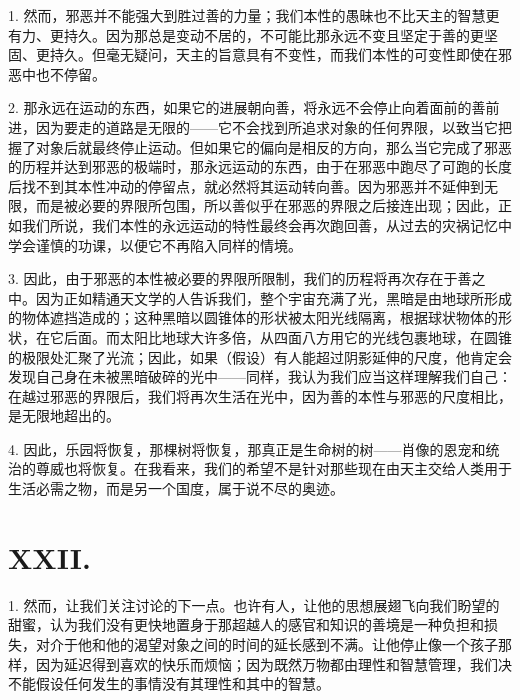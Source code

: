 1. 然而，邪恶并不能强大到胜过善的力量；我们本性的愚昧也不比天主的智慧更有力、更持久。因为那总是变动不居的，不可能比那永远不变且坚定于善的更坚固、更持久。但毫无疑问，天主的旨意具有不变性，而我们本性的可变性即使在邪恶中也不停留。\par

2. 那永远在运动的东西，如果它的进展朝向善，将永远不会停止向着面前的善前进，因为要走的道路是无限的——它不会找到所追求对象的任何界限，以致当它把握了对象后就最终停止运动。但如果它的偏向是相反的方向，那么当它完成了邪恶的历程并达到邪恶的极端时，那永远运动的东西，由于在邪恶中跑尽了可跑的长度后找不到其本性冲动的停留点，就必然将其运动转向善。因为邪恶并不延伸到无限，而是被必要的界限所包围，所以善似乎在邪恶的界限之后接连出现；因此，正如我们所说，我们本性的永远运动的特性最终会再次跑回善，从过去的灾祸记忆中学会谨慎的功课，以便它不再陷入同样的情境。\par

3. 因此，由于邪恶的本性被必要的界限所限制，我们的历程将再次存在于善之中。因为正如精通天文学的人告诉我们，整个宇宙充满了光，黑暗是由地球所形成的物体遮挡造成的；这种黑暗以圆锥体的形状被太阳光线隔离，根据球状物体的形状，在它后面。而太阳比地球大许多倍，从四面八方用它的光线包裹地球，在圆锥的极限处汇聚了光流；因此，如果（假设）有人能超过阴影延伸的尺度，他肯定会发现自己身在未被黑暗破碎的光中——同样，我认为我们应当这样理解我们自己：在越过邪恶的界限后，我们将再次生活在光中，因为善的本性与邪恶的尺度相比，是无限地超出的。\par

4. 因此，乐园将恢复，那棵树将恢复，那真正是生命树的树——肖像的恩宠和统治的尊威也将恢复。在我看来，我们的希望不是针对那些现在由天主交给人类用于生活必需之物，而是另一个国度，属于说不尽的奥迹。\par


\section{XXII. }

1. 然而，让我们关注讨论的下一点。也许有人，让他的思想展翅飞向我们盼望的甜蜜，认为我们没有更快地置身于那超越人的感官和知识的善境是一种负担和损失，对介于他和他的渴望对象之间的时间的延长感到不满。让他停止像一个孩子那样，因为延迟得到喜欢的快乐而烦恼；因为既然万物都由理性和智慧管理，我们决不能假设任何发生的事情没有其理性和其中的智慧。\par


